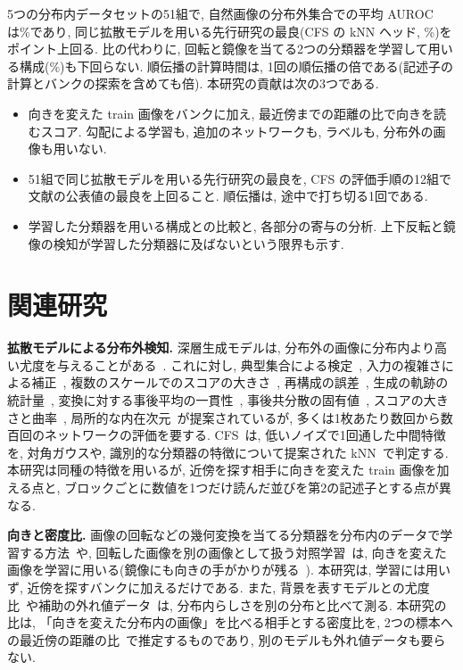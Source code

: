 \documentclass[MIRU,submit]{miru2025j}
\begin{document}
5つの分布内データセットの51組で, 自然画像の分布外集合での平均 AUROC は\nOursT\%であり, 同じ拡散モデルを用いる先行研究の最良(CFS の kNN ヘッド, \nPriorT\%)を\nGapPriorT{}ポイント上回る. 比の代わりに, 回転と鏡像を当てる2つの分類器を学習して用いる構成(\nTrainedT\%)も下回らない. 順伝播の計算時間は, 1回の順伝播の\nPassX{}倍である(記述子の計算とバンクの探索を含めても\nAllX{}倍). 本研究の貢献は次の3つである.
\begin{itemize}
\setlength{\itemsep}{0pt}\setlength{\parskip}{0pt}
\item 向きを変えた train 画像をバンクに加え, 最近傍までの距離の比で向きを読むスコア. 勾配による学習も, 追加のネットワークも, ラベルも, 分布外の画像も用いない.
\item 51組で同じ拡散モデルを用いる先行研究の最良を, CFS の評価手順の12組で文献の公表値の最良を上回ること. 順伝播は, 途中で打ち切る1回である.
\item 学習した分類器を用いる構成との比較と, 各部分の寄与の分析. 上下反転と鏡像の検知が学習した分類器に及ばないという限界も示す.
\end{itemize}

\section{関連研究}
\label{sec:related}
\textbf{拡散モデルによる分布外検知.} 深層生成モデルは, 分布外の画像に分布内より高い尤度を与えることがある~\cite{nalisnick2019deep}. これに対し, 典型集合による検定~\cite{nalisnick2019typ}, 入力の複雑さによる補正~\cite{serra2020input}, 複数のスケールでのスコアの大きさ~\cite{mahmood2021msma}, 再構成の誤差~\cite{graham2023ddpmood}, 生成の軌跡の統計量~\cite{heng2024diffpath}, 変換に対する事後平均の一貫性~\cite{alexis2026gepc}, 事後共分散の固有値~\cite{shoushtari2026eigenscore}, スコアの大きさと曲率~\cite{barkley2026scoped}, 局所的な内在次元~\cite{kamkari2024geometric}が提案されているが, 多くは1枚あたり数回から数百回のネットワークの評価を要する. CFS~\cite{rouzoumka2026cfs}は, 低いノイズで1回通した中間特徴を, 対角ガウスや, 識別的な分類器の特徴について提案された kNN~\cite{sun2022knn}で判定する. 本研究は同種の特徴を用いるが, 近傍を探す相手に向きを変えた train 画像を加える点と, ブロックごとに数値を1つだけ読んだ並びを第2の記述子とする点が異なる.

\textbf{向きと密度比.} 画像の回転などの幾何変換を当てる分類器を分布内のデータで学習する方法~\cite{golan2018geometric,hendrycks2019ss}や, 回転した画像を別の画像として扱う対照学習~\cite{tack2020csi}は, 向きを変えた画像を学習に用いる(鏡像にも向きの手がかりが残る~\cite{lin2020chirality}). 本研究は, 学習には用いず, 近傍を探すバンクに加えるだけである. また, 背景を表すモデルとの尤度比~\cite{ren2019likelihood}や補助の外れ値データ~\cite{hendrycks2019oe}は, 分布内らしさを別の分布と比べて測る. 本研究の比は, 「向きを変えた分布内の画像」を比べる相手とする密度比を, 2つの標本への最近傍の距離の比~\cite{wang2009divergence,sugiyama2012density}で推定するものであり, 別のモデルも外れ値データも要らない.
\end{document}
